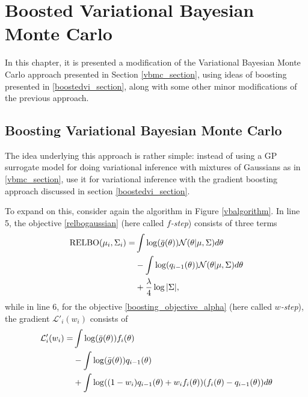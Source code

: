 \chapter{Boosted Variational Bayesian Monte Carlo}

In this chapter, it is presented a modification of the Variational Bayesian Monte Carlo approach presented in Section \ref{vbmc_section}, using ideas of boosting presented in \ref{boostedvi_section}, along with some other minor modifications of the previous approach.

\section{Boosting Variational Bayesian Monte Carlo}

The idea underlying this approach is rather simple: instead of using a GP surrogate model for doing variational inference with mixtures of Gaussians as in \ref{vbmc_section}, use it for variational inference with the gradient boosting approach discussed in section \ref{boostedvi_section}.

To expand on this, consider again the algorithm in Figure \ref{vbalgorithm}. In line 5, the objective \eqref{relbogaussian} (here called \textit{$f$-step}) consists of three terms
\begin{displaymath}
 \begin{split}
 \text{RELBO}(\mu_i,\Sigma_i) = & \int \log({\bar{g}}(\theta)) \mathcal{N}(\theta|\mu,\Sigma) d\theta \\
 & - \int \log(q_{i-1}(\theta)) \mathcal{N}(\theta|\mu,\Sigma) d\theta \\
 & + \frac{\lambda}{4} \log |\Sigma|,
 \end{split}
\end{displaymath}
while in line 6, for the objective \eqref{boosting_objective_alpha} (here called \textit{$w$-step}), the gradient $\mathcal{L}'_i(w_i)$ consists of
\begin{displaymath}
\begin{split}
 \mathcal{L}'_i(w_i) = & \int \log ({\bar{g}}(\theta)) f_{i}(\theta) \\ 
 & -\int \log({\bar{g}}(\theta)) q_{i-1}(\theta)\\
 & + \int \log((1-w_{i}) q_{i-1}(\theta) + w_{i} f_{i}(\theta)) (f_i(\theta) - q_{i-1}(\theta)) d\theta
\end{split}
\end{displaymath}

